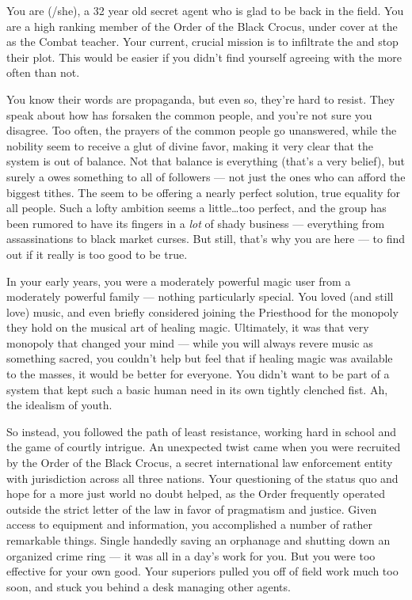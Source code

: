 \documentclass[char]{GL2020}
\begin{document}
\name{\cInterpol{}}

You are \cInterpol{\full} (\cInterpol{\they}/she), a 32 year old secret agent who is glad to be back in the field. You are a high ranking member of the Order of the Black Crocus, under cover at the \pSchool{} as the Combat teacher. Your current, crucial mission is to infiltrate the \pGoaties{} and stop their plot. This would be easier if you didn't find yourself agreeing with the \pGoaties{} more often than not.

You know their words are propaganda, but even so, they're hard to resist. They speak about how \cFarmGod{} has forsaken the common people, and you're not sure you disagree. Too often, the prayers of the common people go unanswered, while the nobility seem to receive a glut of divine favor, making it very clear that the system is out of balance. Not that balance is everything (that's a very \pShippie{} belief), but surely a \cFarmGod{\God} owes something to all of \cFarmGod{\their} followers — not just the ones who can afford the biggest tithes. The \pGoaties{} seem to be offering a nearly perfect solution, true equality for all people. Such a lofty ambition seems a little\ldots{}too perfect, and the group has been rumored to have its fingers in a \emph{lot} of shady business — everything from assassinations to black market curses. But still, that's why you are here — to find out if it really is too good to be true.

In your early years, you were a moderately powerful magic user from a moderately powerful family — nothing particularly special. You loved (and still love) music, and even briefly considered joining the Priesthood for the monopoly they hold on the musical art of healing magic. Ultimately, it was that very monopoly that changed your mind — while you will always revere music as something sacred, you couldn't help but feel that if healing magic was available to the masses, it would be better for everyone. You didn't want to be part of a system that kept such a basic human need in its own tightly clenched fist. Ah, the idealism of youth. 

So instead, you followed the path of least resistance, working hard in school and the game of courtly intrigue. An unexpected twist came when you were recruited by the Order of the Black Crocus, a secret international law enforcement entity with jurisdiction across all three nations. Your questioning of the status quo and hope for a more just world no doubt helped, as the Order frequently operated outside the strict letter of the law in favor of pragmatism and justice. Given access to equipment and information, you accomplished a number of rather remarkable things. Single handedly saving an orphanage and shutting down an organized crime ring — it was all in a day's work for you. But you were too effective for your own good. Your superiors pulled you off of field work much too soon, and stuck you behind a desk managing other agents.
\end{document}
